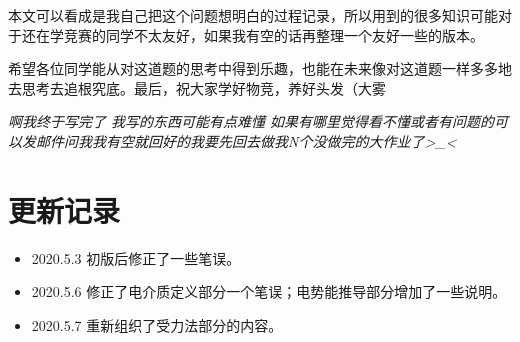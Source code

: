 \documentclass{ctexart}
\begin{document}
	本文可以看成是我自己把这个问题想明白的过程记录，所以用到的很多知识可能对于还在学竞赛的同学不太友好，如果我有空的话再整理一个友好一些的版本。

	希望各位同学能从对这道题的思考中得到乐趣，也能在未来像对这道题一样多多地去思考去追根究底。最后，祝大家学好物竞，养好头发（大雾
	
	\textit{啊我终于写完了 我写的东西可能有点难懂 如果有哪里觉得看不懂或者有问题的可以发邮件问我我有空就回\quad 好的我要先回去做我N个没做完的大作业了>\_<}
	
	\nocite{Shu}
	\nocite{Jackson}
	\nocite{Zhao}
	\nocite{Wu}
	\nocite{Liu}
	
	
	
	
	\section*{更新记录}
	
	\begin{itemize}
		\item 2020.5.3 初版后修正了一些笔误。
		\item 2020.5.6 修正了电介质定义部分一个笔误；电势能推导部分增加了一些说明。
		\item 2020.5.7 重新组织了受力法部分的内容。
	\end{itemize}
\end{document}
